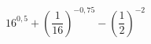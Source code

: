 \begin{ex}[type=calculate]
	\begin{condition}
		\( 16^{0,5}+\left( \dfrac{1}{16} \right)^{-0,75}-\left( \dfrac{1}{2} \right)^{-2} \)
	\end{condition}
\end{ex}